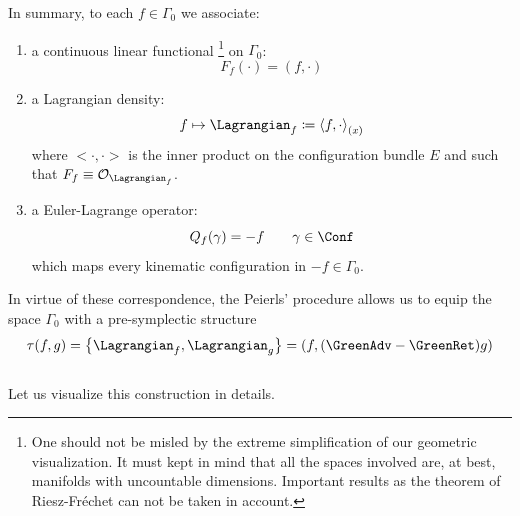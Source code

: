 \documentclass[Main]{subfiles}
\begin{document}
	In summary, to each $f\in \Gamma_0$ we associate:
	\begin{enumerate}
		\item a continuous linear functional 
				\footnote{ One should not be misled by the extreme simplification of our geometric visualization.
				It must kept in mind that all the spaces involved are, at best, manifolds with uncountable dimensions.
				Important results as the theorem of Riesz-Fréchet can not be taken in account.}
			on $\Gamma_0$:
			\begin{displaymath}
				F_f(\cdot) = (f, \cdot)
			\end{displaymath}

		\item a Lagrangian density:
			\begin{displaymath}
				f \mapsto \Lagrangian_f \coloneqq \left\langle  f , \cdot \right\rangle_{(x)}
			\end{displaymath}
			where $<\cdot,\cdot>$ is the inner product on the configuration bundle $E$ and such that $F_f \equiv \mathcal{O}_{\Lagrangian_f}$.
		\item a Euler-Lagrange operator:
			\begin{displaymath}
				Q_{f}(\gamma) = - f \qquad \gamma \in \Conf
			\end{displaymath}
			which maps every kinematic configuration in $-f \in \Gamma_0$.
	\end{enumerate}
	In virtue of these correspondence, the Peierls' procedure allows us to equip the space $\Gamma_0$ with a pre-symplectic structure
	\begin{displaymath}
		\tau(f,g) =  \left\lbrace \Lagrangian_f , \Lagrangian_g \right\rbrace = \left( f, (\GreenAdv - \GreenRet) g \right)
	\end{displaymath}
	\vspace{2mm}\\
	Let us visualize this construction in details.
	
\end{document}
